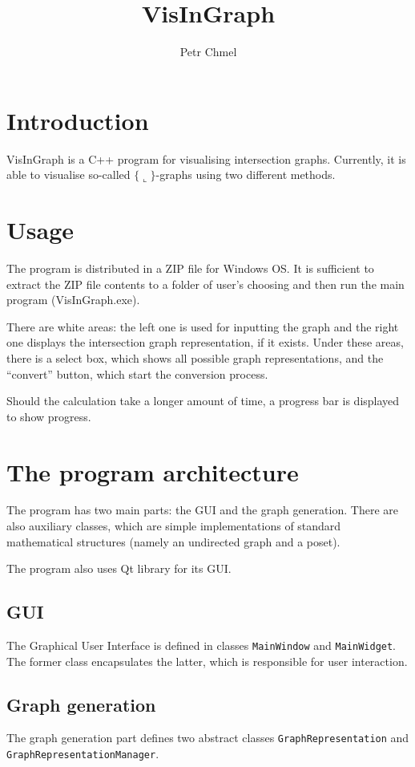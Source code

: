 \documentclass{article}
\begin{document}
\title{VisInGraph}
\author{Petr Chmel}
\date{}

\maketitle
\section{Introduction}
VisInGraph is a C++ program for visualising intersection graphs.
Currently, it is able to visualise so-called $\{\llcorner\}$-graphs using two different methods.

\section{Usage}
The program is distributed in a ZIP file for Windows OS.
It is sufficient to extract the ZIP file contents to a folder of user's choosing and then run the main program (VisInGraph.exe).

There are white areas: the left one is used for inputting the graph and the right one displays the intersection graph representation, if it exists.
Under these areas, there is a select box, which shows all possible graph representations, and the ``convert'' button, which start the conversion process.

Should the calculation take a longer amount of time, a progress bar is displayed to show progress.

\section{The program architecture}
The program has two main parts: the GUI and the graph generation.
There are also auxiliary classes, which are simple implementations of standard mathematical structures (namely an undirected graph and a poset).

The program also uses Qt library for its GUI.

\subsection{GUI}
The Graphical User Interface is defined in classes \texttt{MainWindow} and \texttt{MainWidget}.
The former class encapsulates the latter, which is responsible for user interaction.


\subsection{Graph generation}
The graph generation part defines two abstract classes \texttt{GraphRepresentation} and \texttt{GraphRepresentationManager}.
\end{document}
